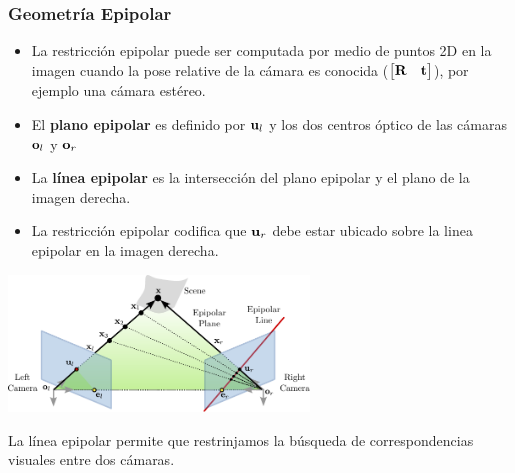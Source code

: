 \begin{frame}
    \frametitle{Geometría Epipolar}
    \footnotesize
    \begin{itemize}
        \item La restricción epipolar puede ser computada por medio de puntos 2D en la imagen cuando la pose relative de la cámara es conocida 
        ($\begin{bmatrix}
        \boldsymbol{\mathbf{R}} & \boldsymbol{\mathbf{t}}
        \end{bmatrix}$), por ejemplo una cámara estéreo.
        \item El \textbf{plano epipolar} es definido por $\boldsymbol{\mathbf{u}}_{l}$ y los dos centros óptico de las cámaras $\boldsymbol{\mathbf{o}}_{l}$ y $\boldsymbol{\mathbf{o}}_{r}$
        \item La \textbf{línea epipolar} es la intersección del plano epipolar y el plano de la imagen derecha.
        \item La restricción epipolar codifica que $\boldsymbol{\mathbf{u}}_{r}$ debe estar ubicado sobre la linea epipolar en la imagen derecha.
    \end{itemize}

    \begin{center}
        \includegraphics[width=0.6\textwidth]{./images/epipolar_geometry_epipolar_line.pdf}
    \end{center}

    La línea epipolar permite que restrinjamos la búsqueda de correspondencias visuales entre dos cámaras.

\end{frame}

